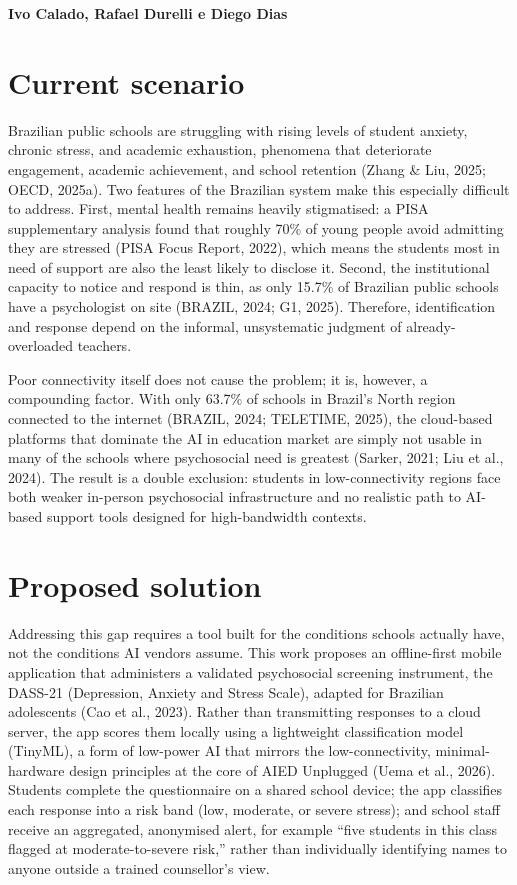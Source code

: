 \documentclass[
  12pt,
  openright,
  oneside,
  a4paper,
  english,
  brazil
]{abntex2}
\begin{document}
\begin{center}
\textbf{Ivo Calado, Rafael Durelli e Diego Dias}
\end{center}

\section{Current scenario}

Brazilian public schools are struggling with rising levels of student anxiety,
chronic stress, and academic exhaustion, phenomena that deteriorate engagement,
academic achievement, and school retention (Zhang \& Liu, 2025; OECD, 2025a).
Two features of the Brazilian system make this especially difficult to address.
First, mental health remains heavily stigmatised: a PISA supplementary analysis
found that roughly 70\% of young people avoid admitting they are stressed (PISA
Focus Report, 2022), which means the students most in need of support are also
the least likely to disclose it. Second, the institutional capacity to notice
and respond is thin, as only 15.7\% of Brazilian public schools have a
psychologist on site (BRAZIL, 2024; G1, 2025). Therefore, identification and
response depend on the informal, unsystematic judgment of already-overloaded
teachers.

Poor connectivity itself does not cause the problem; it is, however, a
compounding factor. With only 63.7\% of schools in Brazil's North region
connected to the internet (BRAZIL, 2024; TELETIME, 2025), the cloud-based
platforms that dominate the AI in education market are simply not usable in
many of the schools where psychosocial need is greatest (Sarker, 2021; Liu et
al., 2024). The result is a double exclusion: students in low-connectivity
regions face both weaker in-person psychosocial infrastructure and no realistic
path to AI-based support tools designed for high-bandwidth contexts.

\section{Proposed solution}

Addressing this gap requires a tool built for the conditions schools actually
have, not the conditions AI vendors assume. This work proposes an offline-first
mobile application that administers a validated psychosocial screening
instrument, the DASS-21 (Depression, Anxiety and Stress Scale), adapted for
Brazilian adolescents (Cao et al., 2023). Rather than transmitting responses to
a cloud server, the app scores them locally using a lightweight classification
model (TinyML), a form of low-power AI that mirrors the low-connectivity,
minimal-hardware design principles at the core of AIED Unplugged (Uema et al.,
2026). Students complete the questionnaire on a shared school device; the app
classifies each response into a risk band (low, moderate, or severe stress); and
school staff receive an aggregated, anonymised alert, for example ``five
students in this class flagged at moderate-to-severe risk,'' rather than
individually identifying names to anyone outside a trained counsellor's view.
\end{document}
